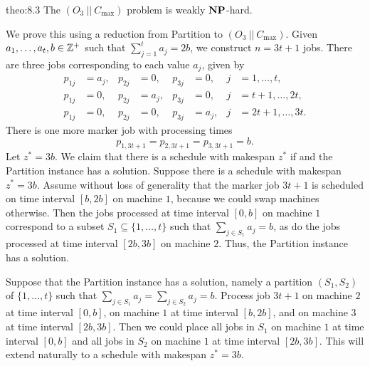\begin{theo}{theo:8.3}
    The $(O_3~||~C_{\max})$ problem is weakly $\operatorname{\textbf{NP}}$-hard. 
\end{theo}
\begin{pf}
    We prove this using a reduction from {\sc Partition} to 
    $(O_3~||~C_{\max})$. Given $a_1, \dots, a_t, b \in \mathbb{Z}^+$ such that 
    $\sum_{j=1}^t a_j = 2b$, we construct $n = 3t + 1$ jobs. There are three 
    jobs corresponding to each value $a_j$, given by 
    \begin{align*}
        p_{1j} &= a_j, & p_{2j} &= 0, & p_{3j} &= 0, & j &= 1, \dots, t, \\
        p_{1j} &= 0, & p_{2j} &= a_j, & p_{3j} &= 0, & j &= t+1, \dots, 2t, \\
        p_{1j} &= 0, & p_{2j} &= 0, & p_{3j} &= a_j, & j &= 2t+1, \dots, 3t.
    \end{align*}
    There is one more marker job with processing times 
    \[ p_{1,3t+1} = p_{2,3t+1} = p_{3,3t+1} = b. \] 
    Let $z^* = 3b$. We claim that there is a schedule with makespan 
    $z^*$ if and the {\sc Partition} instance has a solution. 
    Suppose there is a schedule with makespan $z^* = 3b$. Assume 
    without loss of generality that the marker job $3t+1$ is scheduled 
    on time interval $[b, 2b]$ on machine $1$, because we could swap 
    machines otherwise. Then the jobs processed at time interval 
    $[0, b]$ on machine $1$ correspond to a subset $S_1 \subseteq 
    \{1, \dots, t\}$ such that $\sum_{j\in S_1} a_j = b$, 
    as do the jobs processed at time interval $[2b, 3b]$ on machine $2$. 
    Thus, the {\sc Partition} instance has a solution. 
 
    Suppose that the {\sc Partition} instance has a solution, namely a 
    partition $(S_1, S_2)$ of $\{1, \dots, t\}$ such that 
    $\sum_{j\in S_1} a_j = \sum_{j\in S_2} a_j = b$. Process 
    job $3t+1$ on machine $2$ at time interval $[0, b]$, on machine 
    $1$ at time interval $[b, 2b]$, and on machine $3$ at time interval 
    $[2b, 3b]$. Then we could place all jobs in $S_1$ on machine $1$ 
    at time interval $[0, b]$ and all jobs in $S_2$ on machine $1$ 
    at time interval $[2b, 3b]$. This will extend naturally to a schedule 
    with makespan $z^* = 3b$. 
\end{pf}

